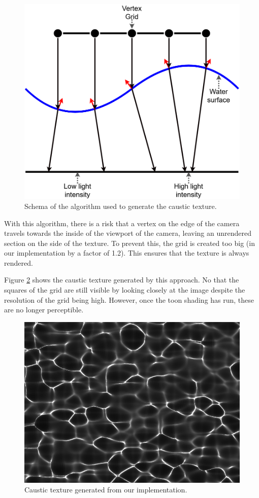 \documentclass{article}
\begin{document}
\begin{figure}[h]
	\centering
	\includegraphics[width=.9\columnwidth]{imgs/caustic_algorithm.png}
	\caption{Schema of the algorithm used to generate the caustic texture.}
	\label{fig:caustic_algorithm}
\end{figure}

\noindent
With this algorithm, there is a risk that a vertex on the edge of the camera travels towards the 
inside of the viewport of the camera, leaving an unrendered section on the side of the texture. 
To prevent this, the grid is created too big (in our implementation by a factor of 1.2). 
This ensures that the texture is always rendered.

\medskip \par
\noindent
Figure \ref{fig:caustics_texture} shows the caustic texture generated by this approach. 
No that the squares of the grid are still visible by looking closely at the image despite the resolution 
of the grid being high. However, once the toon shading has run, these are no longer perceptible.

\begin{figure}[h]
    \centering
    \includegraphics[width=.6\columnwidth]{imgs/caustics_texture.png}
    \caption{Caustic texture generated from our implementation.}
    \label{fig:caustics_texture}
\end{figure}
\end{document}
